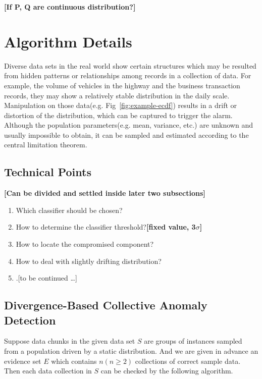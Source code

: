 \documentclass[a4paper]{IEEEtran}
\begin{document}
			\textbf{[If P, Q are continuous distribution?]}
	
	\section{Algorithm Details}\label{sec:algorithm-details}
		Diverse data sets in the real world show certain structures which may be resulted from hidden patterns or relationships among records in a collection of data. For example, the volume of vehicles in the highway and the business transaction records, they may show a relatively stable distribution in the daily scale. Manipulation on those data(e.g. Fig~\ref{fig:example-ecdf}) results in a drift or distortion of the distribution, which can be captured to trigger the alarm.
		Although the population parameters(e.g. mean, variance, etc.) are unknown and usually impossible to obtain, it can be sampled and estimated according to the central limitation theorem.
		
		\subsection{Technical Points}
			\textbf{[Can be divided and settled inside later two subsections]}
			\begin{enumerate}
				\item Which classifier should be chosen?
				\item How to determine the classifier threshold?\textbf{[fixed value, 3$\sigma$]}
				\item How to locate the compromised component?
				\item How to deal with slightly drifting distribution?
				\item .[to be continued \dots]
			\end{enumerate}
			
		\subsection{Divergence-Based Collective Anomaly Detection}
			Suppose data chunks in the given data set $S$ are groups of instances sampled from a population driven by a static distribution. And we are given in advance an evidence set $E$ which contains $n(n\ge2)$ collections of correct sample data. Then each data collection in $S$ can be checked by the following algorithm.
			
\end{document}
